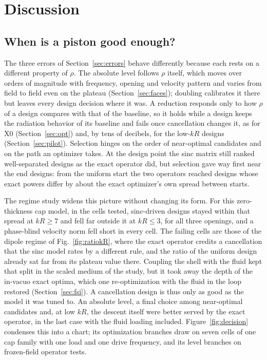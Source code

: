 \documentclass[preprint,12pt]{elsarticle}
\begin{document}
\section{Discussion}
\label{sec:discussion}
\subsection{When is a piston good enough?}
The three errors of Section~\ref{sec:errors} behave differently because each rests on a different property of $\rho$. The absolute level follows $\rho$ itself, which moves over orders of magnitude with frequency, opening and velocity pattern and varies from field to field even on the plateau (Section~\ref{sec:faces}); doubling calibrates it there but leaves every design decision where it was. A reduction responds only to how $\rho$ of a design compares with that of the baseline, so it holds while a design keeps the radiation behavior of its baseline and fails once cancellation changes it, as for X0 (Section~\ref{sec:opt}) and, by tens of decibels, for the low-$kR$ designs (Section~\ref{sec:pilot}). Selection hinges on the order of near-optimal candidates and on the path an optimizer takes. At the design point the sinc matrix still ranked well-separated designs as the exact operator did, but selection gave way first near the end designs: from the uniform start the two operators reached designs whose exact powers differ by about the exact optimizer's own spread between starts.

The regime study widens this picture without changing its form. For this zero-thickness cap model, in the cells tested, sinc-driven designs stayed within that spread at $kR\ge7$ and fell far outside it at $kR\le3$, for all three openings, and a phase-blind velocity norm fell short in every cell. The failing cells are those of the dipole regime of Fig.~\ref{fig:ratiokR}, where the exact operator credits a cancellation that the sinc model rates by a different rule, and the ratio of the uniform design already sat far from its plateau value there. Coupling the shell with the fluid kept that split in the scaled medium of the study, but it took away the depth of the in-vacuo exact optima, which one re-optimization with the fluid in the loop restored (Section~\ref{sec:fsi}). A cancellation design is thus only as good as the model it was tuned to. An absolute level, a final choice among near-optimal candidates and, at low $kR$, the descent itself were better served by the exact operator, in the last case with the fluid loading included. Figure~\ref{fig:decision} condenses this into a chart; its optimization branches draw on seven cells of one cap family with one load and one drive frequency, and its level branches on frozen-field operator tests.
\end{document}
